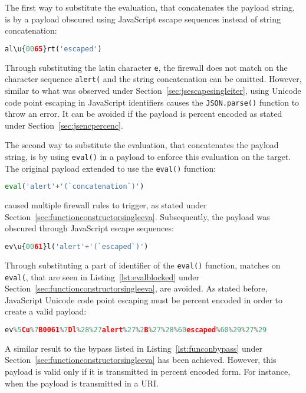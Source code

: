 The first way to substitute the evaluation, that concatenates the payload string, is by a payload obscured using JavaScript escape sequences instead of string concatenation:

\begin{lstlisting}[style=basicStyle, language=Python]
al\u{0065}rt('escaped')
\end{lstlisting}

Through substituting the latin character \verb|e|, the firewall does not match on the character sequence \verb|alert(| and the string concatenation can be omitted. However, similar to what was observed under Section~\ref{sec:jsescapesingleiter}, using Unicode code point escaping in JavaScript identifiers causes the \verb|JSON.parse()| function to throw an error. It can be avoided if the payload is percent encoded as stated under Section~\ref{sec:jsencpercenc}.

The second way to substitute the evaluation, that concatenates the payload string, is by using \verb|eval()| in a payload to enforce this evaluation on the target. The original payload extended to use the \verb|eval()| function:

\begin{lstlisting}[style=basicStyle, language=Python]
eval('alert'+'(`concatenation`)')
\end{lstlisting}

caused multiple firewall rules to trigger, as stated under Section~\ref{sec:functionconstructorsingleeva}. Subsequently, the payload was obscured through JavaScript escape sequences:

\begin{lstlisting}[style=basicStyle, language=Python]
ev\u{0061}l('alert'+'(`escaped`)')
\end{lstlisting}

Through substituting a part of identifier of the \verb|eval()| function, matches on \verb|eval(|, that are seen in Listing~\ref{lst:evalblocked} under Section~\ref{sec:functionconstructorsingleeva}, are avoided. As stated before, JavaScript Unicode code point escaping must be percent encoded in order to create a valid payload:

\begin{lstlisting}[style=basicStyle, language=Python, caption='ev\textbackslash u\{0061\}l('alert' + '(`escaped`)') percent encoded bypass]
ev%5Cu%7B0061%7Dl%28%27alert%27%2B%27%28%60escaped%60%29%27%29
\end{lstlisting}

A similar result to the bypass listed in Listing~\ref{lst:funconbypass} under Section~\ref{sec:functionconstructorsingleeva} has been achieved. However, this payload is valid only if it is transmitted in percent encoded form. For instance, when the payload is transmitted in a URI.


